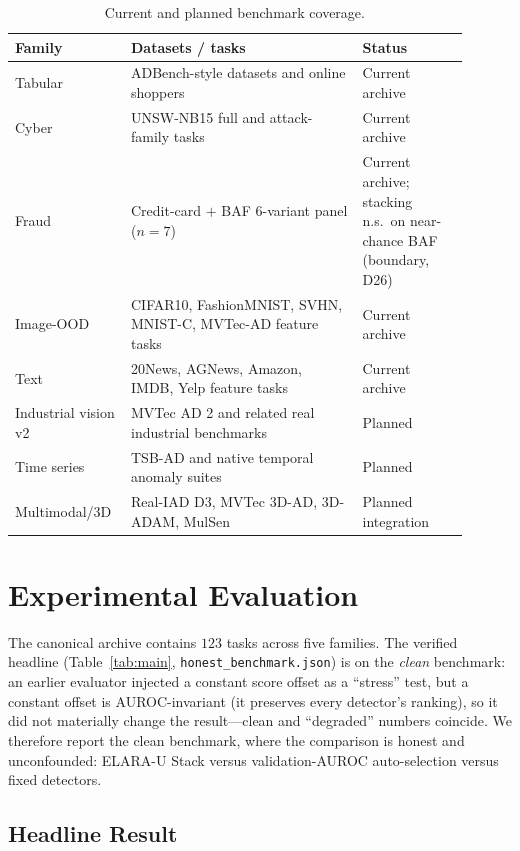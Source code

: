 \documentclass[11pt,titlepage]{article}
\newcommand{\systemu}{ELARA-U}
\begin{document}
\begin{table}[H]
\centering
\caption{Current and planned benchmark coverage.}
\label{tab:manifest}
\small
\begin{tabular}{L{0.20\linewidth}L{0.48\linewidth}L{0.22\linewidth}}
\toprule
\textbf{Family} & \textbf{Datasets / tasks} & \textbf{Status} \\
\midrule
Tabular & ADBench-style datasets and online shoppers & Current archive \\
Cyber & UNSW-NB15 full and attack-family tasks & Current archive \\
Fraud & Credit-card $+$ BAF 6-variant panel ($n{=}7$) & Current archive; stacking n.s.\ on near-chance BAF (boundary, D26) \\
Image-OOD & CIFAR10, FashionMNIST, SVHN, MNIST-C, MVTec-AD feature tasks & Current archive \\
Text & 20News, AGNews, Amazon, IMDB, Yelp feature tasks & Current archive \\
Industrial vision v2 & MVTec AD 2 and related real industrial benchmarks & Planned \\
Time series & TSB-AD and native temporal anomaly suites & Planned \\
Multimodal/3D & Real-IAD D3, MVTec 3D-AD, 3D-ADAM, MulSen & Planned integration \\
\bottomrule
\end{tabular}
\end{table}

\section{Experimental Evaluation}

The canonical archive contains $123$ tasks across five families. The verified
headline (Table~\ref{tab:main}, \texttt{honest\_benchmark.json}) is on the
\emph{clean} benchmark: an earlier evaluator injected a constant score offset as a
``stress'' test, but a constant offset is AUROC-invariant (it preserves every
detector's ranking), so it did not materially change the result---clean and
``degraded'' numbers coincide. We therefore report the clean benchmark, where the
comparison is honest and unconfounded: \systemu{} Stack versus validation-AUROC
auto-selection versus fixed detectors.

\subsection{Headline Result}\label{sec:headline}
\end{document}
